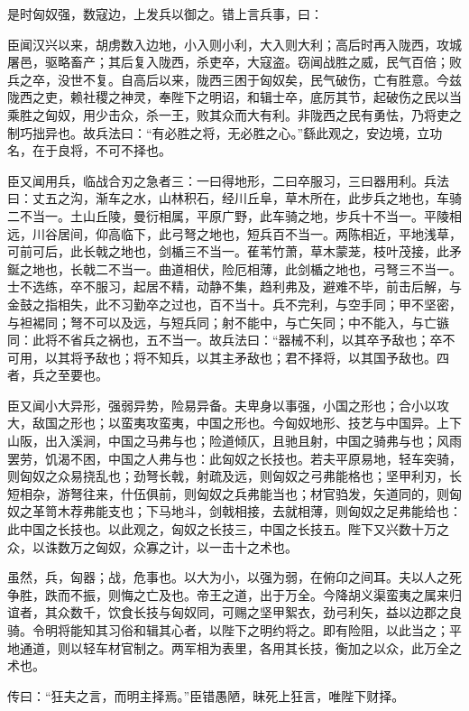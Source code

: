 \documentclass[]{article}
\begin{document}
是时匈奴强，数寇边，上发兵以御之。错上言兵事，曰：

臣闻汉兴以来，胡虏数入边地，小入则小利，大入则大利；高后时再入陇西，攻城屠邑，驱略畜产；其后复入陇西，杀吏卒，大寇盗。窃闻战胜之威，民气百倍；败兵之卒，没世不复。自高后以来，陇西三困于匈奴矣，民气破伤，亡有胜意。今兹陇西之吏，赖社稷之神灵，奉陛下之明诏，和辑士卒，底厉其节，起破伤之民以当乘胜之匈奴，用少击众，杀一王，败其众而大有利。非陇西之民有勇怯，乃将吏之制巧拙异也。故兵法曰：``有必胜之将，无必胜之心。''繇此观之，安边境，立功名，在于良将，不可不择也。

臣又闻用兵，临战合刃之急者三：一曰得地形，二曰卒服习，三曰器用利。兵法曰：丈五之沟，渐车之水，山林积石，经川丘阜，草木所在，此步兵之地也，车骑二不当一。土山丘陵，曼衍相属，平原广野，此车骑之地，步兵十不当一。平陵相远，川谷居间，仰高临下，此弓弩之地也，短兵百不当一。两陈相近，平地浅草，可前可后，此长戟之地也，剑楯三不当一。萑苇竹萧，草木蒙茏，枝叶茂接，此矛鋋之地也，长戟二不当一。曲道相伏，险厄相薄，此剑楯之地也，弓弩三不当一。士不选练，卒不服习，起居不精，动静不集，趋利弗及，避难不毕，前击后解，与金鼓之指相失，此不习勤卒之过也，百不当十。兵不完利，与空手同；甲不坚密，与袒裼同；弩不可以及远，与短兵同；射不能中，与亡矢同；中不能入，与亡镞同：此将不省兵之祸也，五不当一。故兵法曰：``器械不利，以其卒予敌也；卒不可用，以其将予敌也；将不知兵，以其主矛敌也；君不择将，以其国予敌也。四者，兵之至要也。

臣又闻小大异形，强弱异势，险易异备。夫卑身以事强，小国之形也；合小以攻大，敌国之形也；以蛮夷攻蛮夷，中国之形也。今匈奴地形、技艺与中国异。上下山阪，出入溪涧，中国之马弗与也；险道倾仄，且驰且射，中国之骑弗与也；风雨罢劳，饥渴不困，中国之人弗与也：此匈奴之长技也。若夫平原易地，轻车突骑，则匈奴之众易挠乱也；劲弩长戟，射疏及远，则匈奴之弓弗能格也；坚甲利刃，长短相杂，游弩往来，什伍俱前，则匈奴之兵弗能当也；材官驺发，矢道同的，则匈奴之革笥木荐弗能支也；下马地斗，剑戟相接，去就相薄，则匈奴之足弗能给也：此中国之长技也。以此观之，匈奴之长技三，中国之长技五。陛下又兴数十万之众，以诛数万之匈奴，众寡之计，以一击十之术也。

虽然，兵，匈器；战，危事也。以大为小，以强为弱，在俯卬之间耳。夫以人之死争胜，跌而不振，则悔之亡及也。帝王之道，出于万全。今降胡义渠蛮夷之属来归谊者，其众数千，饮食长技与匈奴同，可赐之坚甲絮衣，劲弓利矢，益以边郡之良骑。令明将能知其习俗和辑其心者，以陛下之明约将之。即有险阻，以此当之；平地通道，则以轻车材官制之。两军相为表里，各用其长技，衡加之以众，此万全之术也。

传曰：``狂夫之言，而明主择焉。''臣错愚陋，昧死上狂言，唯陛下财择。
\end{document}
